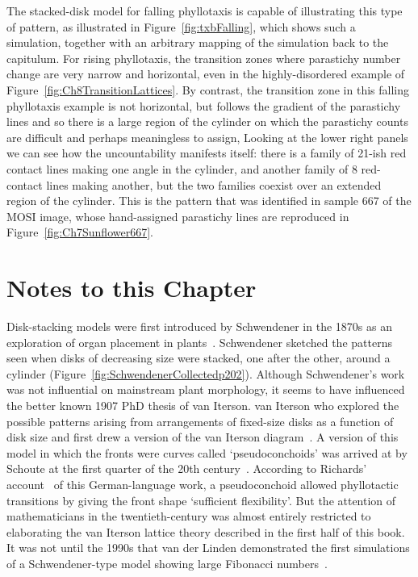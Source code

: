 The stacked-disk model for falling phyllotaxis is  capable of illustrating this type of pattern, as illustrated in Figure~\ref{fig:txbFalling}, which 
shows such a simulation, together with an arbitrary mapping of the simulation back to the capitulum. 
For rising phyllotaxis, the transition zones where parastichy number change are very narrow and horizontal, even in the highly-disordered example of Figure~\ref{fig:Ch8TransitionLattices}. By contrast, the transition zone in this falling phyllotaxis example is not horizontal, but follows the gradient of the parastichy lines and so  there is a large region of the cylinder on which the parastichy counts are difficult and perhaps meaningless to assign, Looking at the lower right panels we can see how the uncountability manifests itself: there is a family of 21-ish red contact lines making one angle in the cylinder, and another family of 8 red-contact lines making another, but the two families coexist over an extended region of the cylinder. This is the pattern that was identified in sample 667 of the MOSI image, whose hand-assigned parastichy lines are reproduced in Figure~\ref{fig:Ch7Sunflower667}.
 
 
\clearpage
\section{Notes to this Chapter}Disk-stacking models were first introduced by Schwendener in the 1870s as an exploration of organ placement in plants~\cite{schwendenerMechanischeTheorieBlattstellungen1878}.  Schwendener sketched the patterns seen when disks of decreasing size were stacked, one after the other, around a cylinder (Figure~\ref{fig:SchwendenerCollectedp202}).
Although Schwendener's work was not influential on mainstream plant morphology, it seems to have influenced the better known 1907 PhD thesis of van Iterson. van Iterson  who explored the possible patterns arising from arrangements of fixed-size disks as a function of disk size and first drew a version of the van Iterson diagram~\cite{vanitersonjrMathematischeUndMikroscopischAnatomische1907}. 
A version of this model in which the fronts were curves called `pseudoconchoids'  was  arrived at by Schoute at the first quarter of the 20th century~\cite{schouteUberPseudokonchoiden1913}. According to  Richards' account~\cite{richardsGeometryPhyllotaxisIts1948}  of this German-language work, a pseudoconchoid allowed phyllotactic transitions by giving the front shape `sufficient flexibility'. But 
the attention of mathematicians in the twentieth-century was almost entirely restricted to elaborating the van Iterson lattice theory described in the first half of this book.  It was not until the  1990s that van der Linden demonstrated the first simulations of a Schwendener-type model showing large Fibonacci numbers~\cite{vanderlindenCreatingPhyllotaxisDislodgement1990}.

